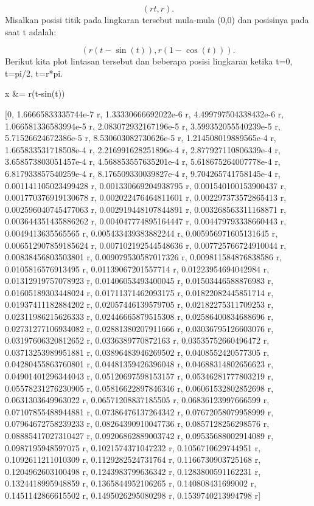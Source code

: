 \documentclass{article}
\begin{document}
$$(rt,r).$$Misalkan posisi titik pada lingkaran tersebut mula-mula (0,0) dan
posisinya pada saat t adalah:


$$(r(t-\sin(t)),r(1-\cos(t))).$$Berikut kita plot lintasan tersebut dan beberapa posisi lingkaran
ketika t=0, t=pi/2, t=r*pi.


\>x &= r\*(t-sin(t))


    
            [0, 1.66665833335744e-7 r, 1.33330666692022e-6 r, 
    4.499797504338432e-6 r, 1.066581336583994e-5 r, 
    2.083072932167196e-5 r, 3.599352055540239e-5 r, 
    5.71526624672386e-5 r, 8.530603082730626e-5 r, 
    1.214508019889565e-4 r, 1.665833531718508e-4 r, 
    2.216991628251896e-4 r, 2.877927110806339e-4 r, 
    3.658573803051457e-4 r, 4.568853557635201e-4 r, 
    5.618675264007778e-4 r, 6.817933857540259e-4 r, 
    8.176509330039827e-4 r, 9.704265741758145e-4 r, 
    0.001141105023499428 r, 0.001330669204938795 r, 
    0.001540100153900437 r, 0.001770376919130678 r, 
    0.002022476464811601 r, 0.002297373572865413 r, 
    0.002596040745477063 r, 0.002919448107844891 r, 
    0.003268563311168871 r, 0.003644351435886262 r, 
    0.004047774895164447 r, 0.004479793338660443 r, 0.0049413635565565 r, 
    0.005433439383882244 r, 0.005956971605131645 r, 
    0.006512907859185624 r, 0.007102192544548636 r, 
    0.007725766724910044 r, 0.00838456803503801 r, 
    0.009079530587017326 r, 0.009811584876838586 r, 0.0105816576913495 r, 
    0.01139067201557714 r, 0.01223954694042984 r, 0.01312919757078923 r, 
    0.01406053493400045 r, 0.01503446588876983 r, 0.01605189303448024 r, 
    0.01711371462093175 r, 0.01822082445851714 r, 0.01937411182884202 r, 
    0.02057446139579705 r, 0.02182275311709253 r, 0.02311986215626333 r, 
    0.02446665879515308 r, 0.02586400834688696 r, 0.02731277106934082 r, 
    0.02881380207911666 r, 0.03036795126603076 r, 0.03197606320812652 r, 
    0.0336389770872163 r, 0.03535752660496472 r, 0.03713253989951881 r, 
    0.03896483946269502 r, 0.0408552420577305 r, 0.04280455863760801 r, 
    0.04481359426396048 r, 0.04688314802656623 r, 0.04901401296344043 r, 
    0.05120697598153157 r, 0.05346281777803219 r, 0.05578231276230905 r, 
    0.05816622897846346 r, 0.06061532802852698 r, 0.0631303649963022 r, 
    0.06571208837185505 r, 0.06836123997666599 r, 0.07107855488944881 r, 
    0.07386476137264342 r, 0.07672058079958999 r, 0.07964672758239233 r, 
    0.08264390910047736 r, 0.0857128256298576 r, 0.08885417027310427 r, 
    0.09206862889003742 r, 0.09535688002914089 r, 0.0987195948597075 r, 
    0.1021574371047232 r, 0.1056710629744951 r, 0.1092611211010309 r, 
    0.1129282524731764 r, 0.1166730903725168 r, 0.1204962603100498 r, 
    0.1243983799636342 r, 0.1283800591162231 r, 0.1324418995948859 r, 
    0.1365844952106265 r, 0.140808431699002 r, 0.1451142866615502 r, 
    0.1495026295080298 r, 0.1539740213994798 r]
    
\end{document}
